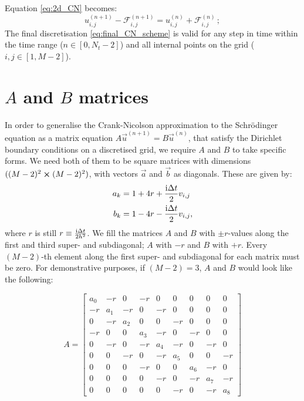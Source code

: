 Equation \eqref{eq:2d_CN} becomes:
\begin{equation}\label{eq:final_CN_scheme}
    u_{i,j}^{(n+1)} - \mathcal{F}_{i,j}^{(n+1)} = u_{i, j}^{(n)} + \mathcal{F}_{i,j}^{(n)} \, ;
\end{equation} 
The final discretisation \eqref{eq:final_CN_scheme} is valid for any step in time within the time range ($n\in[0, N_t-2]$) and all internal points on the grid ($i,j \in [1, M-2]$).


\newpage

\section{$A$ and $B$ matrices}\label{app:A_and_B}
    In order to generalise the Crank-Nicolson approximation to the Schrödinger equation as a matrix equation $A\vec{u}^{(n+1)} = B\vec{u}^{(n)}$, that satisfy the Dirichlet boundary conditions on a discretised grid, we require $A$ and $B$ to take specific forms. We need both of them to be square matrices with dimensions $((M-2)^2\cross(M-2)^2)$, with vectors $\vec{a}$ and $\vec{b}$ as diagonals. These are given by:
    \begin{equation}
        \begin{split}
            a_k &= 1+4r +\frac{\mathrm{i}\Delta t}{2}v_{i,j} \\
            b_k &= 1-4r -\frac{\mathrm{i}\Delta t}{2}v_{i,j},
        \end{split}
    \end{equation}
    where $r$ is still $r\equiv \frac{\mathrm{i}\Delta t}{2h^2}$. We fill the matrices $A$ and $B$ with $\pm r$-values along the first and third super- and subdiagonal; $A$ with $-r$ and $B$ with $+r$. Every $(M-2)$-th element along the first super- and subdiagonal for each matrix must be zero. For demonstrative purposes, if $(M-2)=3$, $A$ and $B$ would look like the following:

    \begin{equation}
        A = 
        \begin{bmatrix} 
            a_0 & -r  & 0 & -r & 0 & 0 & 0 & 0 & 0 \\
            -r  & a_1 & -r & 0 & -r & 0 & 0 & 0 & 0 \\
             0  & -r  & a_2 & 0 & 0 & -r & 0 & 0 & 0 \\
            -r  & 0   & 0 & a_3 & -r & 0 & -r & 0 & 0 \\
             0  & -r  & 0 & -r & a_4 & -r & 0 & -r & 0 \\ 
             0  & 0   & -r & 0 & -r & a_5 & 0 & 0 & -r \\
             0  & 0   & 0 & -r & 0 & 0 & a_6 & -r & 0 \\
             0  & 0   & 0 & 0 & -r & 0 & -r & a_7 & -r \\
             0  & 0   & 0 & 0 & 0 & -r & 0 & -r & a_8  
        \end{bmatrix}
    \end{equation}

